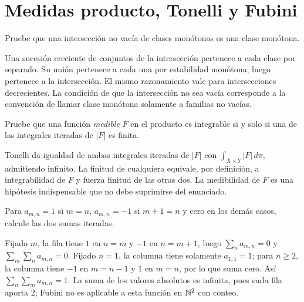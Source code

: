 \chapter{Medidas producto, Tonelli y Fubini}

\begin{ejercicio}\label{ej:v2-l11-1}
Pruebe que una intersección no vacía de clases monótonas es una clase monótona.
\end{ejercicio}
\begin{solucion}
Una sucesión creciente de conjuntos de la intersección pertenece a cada clase por separado. Su unión pertenece a cada una por estabilidad monótona, luego pertenece a la intersección. El mismo razonamiento vale para intersecciones decrecientes. La condición de que la intersección no sea vacía corresponde a la convención de llamar clase monótona solamente a familias no vacías.
\end{solucion}

\begin{ejercicio}\label{ej:v2-l11-2}
Pruebe que una función \emph{medible} $F$ en el producto es integrable si y solo si una de las integrales iteradas de $|F|$ es finita.
\end{ejercicio}
\begin{solucion}
Tonelli da igualdad de ambas integrales iteradas de $|F|$ con $\int_{X\times Y}|F|\,d\pi$, admitiendo infinito. La finitud de cualquiera equivale, por definición, a integrabilidad de $F$ y fuerza finitud de las otras dos. La medibilidad de $F$ es una hipótesis indispensable que no debe suprimirse del enunciado.
\end{solucion}

\begin{ejercicio}\label{ej:v2-l11-3}
Para $a_{m,n}=1$ si $m=n$, $a_{m,n}=-1$ si $m+1=n$ y cero en los demás casos, calcule las dos sumas iteradas.
\end{ejercicio}
\begin{solucion}
Fijado $m$, la fila tiene $1$ en $n=m$ y $-1$ en $n=m+1$, luego $\sum_na_{m,n}=0$ y $\sum_m\sum_na_{m,n}=0$. Fijado $n=1$, la columna tiene solamente $a_{1,1}=1$; para $n\ge2$, la columna tiene $-1$ en $m=n-1$ y $1$ en $m=n$, por lo que suma cero. Así $\sum_n\sum_ma_{m,n}=1$. La suma de los valores absolutos es infinita, pues cada fila aporta $2$; Fubini no es aplicable a esta función en $\mathbb N^2$ con conteo.
\end{solucion}

